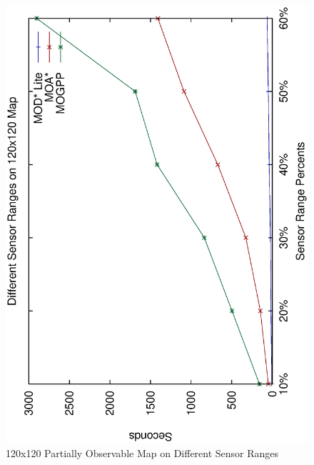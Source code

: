 \documentclass[10pt,journal]{IEEEtran}
\begin{document}
\begin{figure}
\centering
\includegraphics[scale=0.3]{experimental/120x120_partially_normal}
\caption{120x120 Partially Observable Map on Different Sensor Ranges}
\label{fig:120x120sensor}
\end{figure}

%
\end{document}
